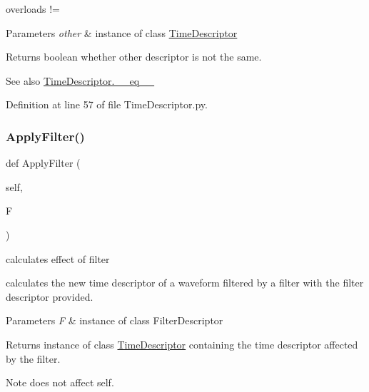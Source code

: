 overloads != 


\begin{DoxyParams}{Parameters}
{\em other} & instance of class \hyperlink{classSignalIntegrity_1_1TimeDomain_1_1Waveform_1_1TimeDescriptor_1_1TimeDescriptor}{Time\+Descriptor} \\
\hline
\end{DoxyParams}
\begin{DoxyReturn}{Returns}
boolean whether other descriptor is not the same. 
\end{DoxyReturn}
\begin{DoxySeeAlso}{See also}
\hyperlink{classSignalIntegrity_1_1TimeDomain_1_1Waveform_1_1TimeDescriptor_1_1TimeDescriptor_ad794ff077f2f05f228a7109f3670ac40}{Time\+Descriptor.\+\_\+\+\_\+eq\+\_\+\+\_\+} 
\end{DoxySeeAlso}


Definition at line 57 of file Time\+Descriptor.\+py.

\mbox{\label{classSignalIntegrity_1_1TimeDomain_1_1Waveform_1_1TimeDescriptor_1_1TimeDescriptor_ad33074bdcb7626cce17d93fbd43ca1a9}} 
\subsubsection{\texorpdfstring{Apply\+Filter()}{ApplyFilter()}}
{\footnotesize\ttfamily def Apply\+Filter (\begin{DoxyParamCaption}\item[{}]{self,  }\item[{}]{F }\end{DoxyParamCaption})}



calculates effect of filter 

calculates the new time descriptor of a waveform filtered by a filter with the filter descriptor provided.


\begin{DoxyParams}{Parameters}
{\em F} & instance of class Filter\+Descriptor \\
\hline
\end{DoxyParams}
\begin{DoxyReturn}{Returns}
instance of class \hyperlink{classSignalIntegrity_1_1TimeDomain_1_1Waveform_1_1TimeDescriptor_1_1TimeDescriptor}{Time\+Descriptor} containing the time descriptor affected by the filter. 
\end{DoxyReturn}
\begin{DoxyNote}{Note}
does not affect self. 
\end{DoxyNote}


